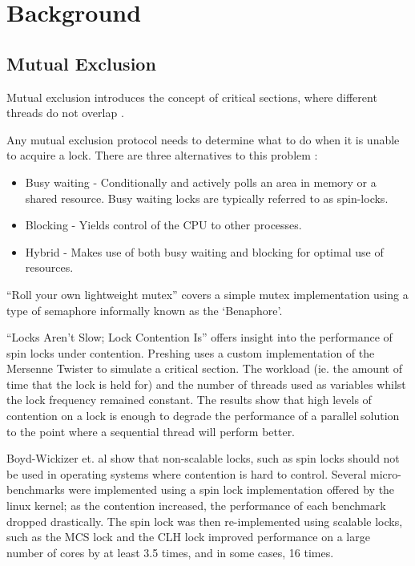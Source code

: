 \chapter{Background}
\section{Mutual Exclusion}
Mutual exclusion introduces the concept of critical sections, where different threads do not overlap \cite[Chapter~2]{herlihy2020art}. 

Any mutual exclusion protocol needs to determine what to do when it is unable to acquire a lock. There are three alternatives to this problem \cite[Chapter~7]{herlihy2020art}:
\begin{itemize}
  \item Busy waiting - Conditionally and actively polls an area in memory or a shared resource. Busy waiting locks are typically referred to as spin-locks.
  \item Blocking - Yields control of the CPU to other processes.
  \item Hybrid - Makes use of both busy waiting and blocking for optimal use of resources.
\end{itemize}

``Roll your own lightweight mutex''\cite{preshingmutex} covers a simple mutex implementation using a type of semaphore informally known as the `Benaphore'\cite{haikubenaphore}.

``Locks Aren't Slow; Lock Contention Is''\cite{preshinglockcontentionslow} offers insight into the performance of spin locks under contention. Preshing uses a custom implementation of the Mersenne Twister \cite{matsumoto1998mersenne} to simulate a critical section. The workload (ie. the amount of time that the lock is held for) and the number of threads used as variables whilst the lock frequency remained constant. The results show that high levels of contention on a lock is enough to degrade the performance of a parallel solution to the point where a sequential thread will perform better.

Boyd-Wickizer et. al show that non-scalable locks, such as spin locks should not be used in operating systems where contention is hard to control. Several micro-benchmarks were implemented using a spin lock implementation offered by the linux kernel; as the contention increased, the performance of each benchmark dropped drastically. The spin lock was then re-implemented using scalable locks, such as the MCS lock \cite{mellor1991algorithms} and the CLH lock \cite{craig1993building,magnusson1994queue} improved performance on a large number of cores by at least 3.5 times, and in some cases, 16 times.

